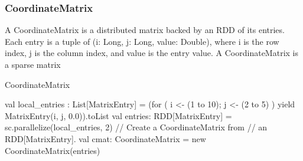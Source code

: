 \documentclass{beamer}
\newcommand{\beb}{\begin{exampleblock}}
\newcommand{\eeb}{\end{exampleblock}}
\begin{document}
\begin{frame}[fragile]
\frametitle{CoordinateMatrix}

A CoordinateMatrix is a distributed matrix backed by an RDD of its entries. 
Each entry is a tuple of (i: Long, j: Long, value: Double), where i is the row index, 
j is the column index, and value is the entry
value. A CoordinateMatrix is a sparse matrix

\beb{CoordinateMatrix}
\begin{code}
val local_entries : List[MatrixEntry] = 
  (for ( i <- (1 to 10); j <- (2 to 5) ) 
  yield MatrixEntry(i, j, 0.0)).toList
val entries: RDD[MatrixEntry] = 
  sc.parallelize(local_entries, 2)
// Create a CoordinateMatrix from 
 // an RDD[MatrixEntry].
val cmat: CoordinateMatrix = new CoordinateMatrix(entries)
\end{code}
\eeb

\end{frame}
\end{document}
